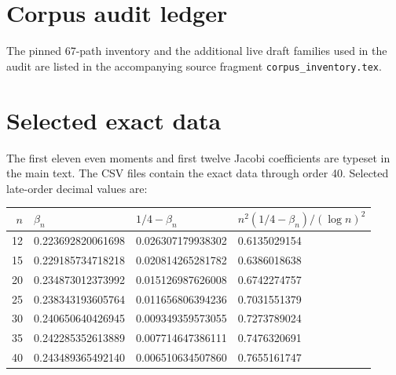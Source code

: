 \documentclass[11pt]{article}
\theoremstyle{definition}
\theoremstyle{remark}
\begin{document}
\section{Corpus audit ledger}\label{app:corpus}

The pinned 67-path inventory and the additional live draft families used in the audit are
listed in the accompanying source fragment \texttt{corpus\_inventory.tex}.



\section{Selected exact data}\label{app:data}

The first eleven even moments and first twelve Jacobi coefficients are typeset in the main
text.  The CSV files contain the exact data through order 40.  Selected late-order decimal
values are:
\begin{center}
\begin{tabular}{rlll}
\toprule
\(n\) & \(\beta_n\) & \(1/4-\beta_n\) &
\(n^2(1/4-\beta_n)/(\log n)^2\) \\
\midrule
12 & 0.223692820061698 & 0.026307179938302 & 0.6135029154 \\
15 & 0.229185734718218 & 0.020814265281782 & 0.6386018638 \\
20 & 0.234873012373992 & 0.015126987626008 & 0.6742274757 \\
25 & 0.238343193605764 & 0.011656806394236 & 0.7031551379 \\
30 & 0.240650640426945 & 0.009349359573055 & 0.7273789024 \\
35 & 0.242285352613889 & 0.007714647386111 & 0.7476320691 \\
40 & 0.243489365492140 & 0.006510634507860 & 0.7655161747 \\
\bottomrule
\end{tabular}
\end{center}
\end{document}
